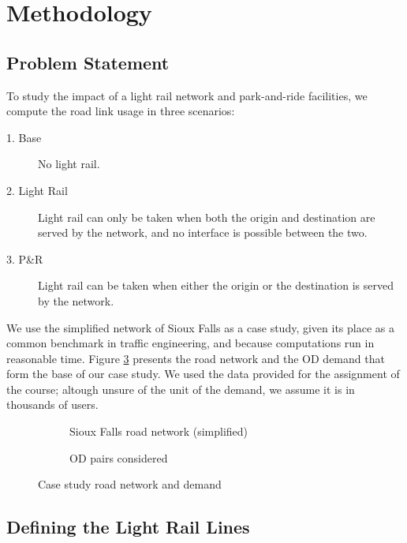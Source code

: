 \section{Methodology}

\subsection{Problem Statement}

To study the impact of a light rail network and park-and-ride facilities, we compute the road link usage in three scenarios:
\begin{description}
    \item[1. Base] No light rail.
    \item[2. Light Rail] Light rail can only be taken when both the origin and destination are served by the network, and no interface is possible between the two.
    \item[3. P\&R] Light rail can be taken when either the origin or the destination is served by the network.
\end{description}

We use the simplified network of Sioux Falls as a case study, given its place as a common benchmark in traffic engineering, and because computations run in reasonable time. Figure \ref{fig:casestudy} presents the road network and the OD demand that form the base of our case study. We used the data provided for the assignment of the course; altough unsure of the unit of the demand, we assume it is in thousands of users.

\begin{figure}
    \centering
    \begin{subfigure}{0.5\textwidth}
    \centering
    \resizebox{\textwidth}{!}{}
    \caption{Sioux Falls road network (simplified)}
    \label{fig:sf_network}
    \end{subfigure}%
    \begin{subfigure}{0.5\textwidth}
    \centering
    \resizebox{\textwidth}{!}{}
    \caption{OD pairs considered}
    \label{fig:od_paires}
    \end{subfigure}
    \caption{Case study road network and demand}
    \label{fig:casestudy}
\end{figure}

\subsection{Defining the Light Rail Lines}

